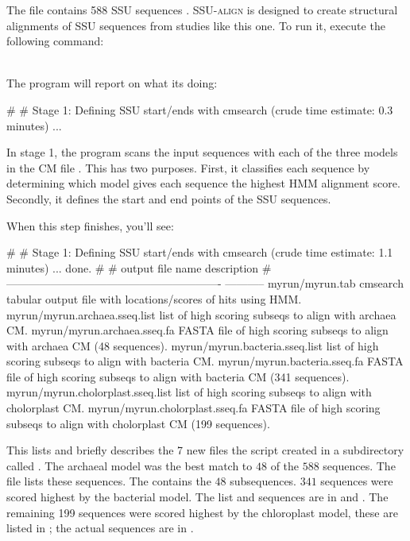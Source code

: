 The file  contains 588 SSU sequences
\cite{Walker07}. \textsc{SSU-align} is designed to create structural
alignments of SSU sequences from studies like this one. To run it,
execute the following command:

\\

The program will report on what its doing:

\begin{sreoutput}
#
# Stage 1: Defining SSU start/ends with cmsearch (crude time estimate: 0.3 minutes) ... 
\end{sreoutput}

In stage 1, the program scans the input sequences with each of the
three models in the CM file . This has two purposes.
First, it classifies each sequence by determining which model gives
each sequence the highest HMM alignment score. Secondly, it defines
the start and end points of the SSU sequences. 

When this step finishes, you'll see:

\begin{sreoutput}
#
# Stage 1: Defining SSU start/ends with cmsearch (crude time estimate: 1.1 minutes) ...  done.
#
# output file name                                            description
# ----------------------------------------------------------  -----------
  myrun/myrun.tab                                             cmsearch tabular output file with locations/scores of hits using HMM.
  myrun/myrun.archaea.sseq.list                               list of high scoring subseqs to align with archaea CM.
  myrun/myrun.archaea.sseq.fa                                 FASTA file of high scoring subseqs to align with archaea CM (48 sequences).
  myrun/myrun.bacteria.sseq.list                              list of high scoring subseqs to align with bacteria CM.
  myrun/myrun.bacteria.sseq.fa                                FASTA file of high scoring subseqs to align with bacteria CM (341 sequences).
  myrun/myrun.cholorplast.sseq.list                           list of high scoring subseqs to align with cholorplast CM.
  myrun/myrun.cholorplast.sseq.fa                             FASTA file of high scoring subseqs to align with cholorplast CM (199 sequences).
\end{sreoutput}

This lists and briefly describes the 7 new files the script created in
a subdirectory called . The archaeal model
was the best match to $48$ of the $588$
sequences. The  file lists
these sequences. The 
contains the $48$ subsequences.  $341$ sequences were
scored highest by the bacterial model.  The list
and sequences are in  and
. The remaining 199 sequences 
were scored highest by the chloroplast model, these are listed in
; the actual sequences are in
.

